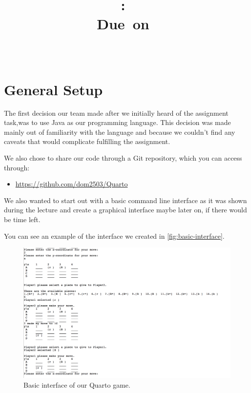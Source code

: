 \documentclass{scrartcl}
\title{
\vspace{2in}
\textmd{\textbf{\hmwkClass:\ \hmwkTitle}}\\
\normalsize\vspace{0.1in}\small{Due\ on\ \hmwkDueDate}\\
\vspace{0.1in}\large{\textit{\hmwkClassInstructor\ \hmwkClassTime}}
\vspace{3in}
}
\author{\textbf{\hmwkAuthorName}}
\date{} %
\begin{document}
\maketitle



\newpage
\tableofcontents
\newpage

\section{General Setup}

The first decision our team made after we initially heard of the assignment task,was to use Java as our programming language. This decision was made mainly out of familiarity with the language and because we couldn't find any caveats that would complicate fulfilling the assignment.

We also chose to share our code through a Git repository, which you can access through:

\begin{itemize}
\item \url{https://github.com/dom2503/Quarto}
\end{itemize}

We also wanted to start out with a basic command line interface as it was shown during the lecture and create a graphical interface maybe later on, if there would be time left.

You can see an example of the interface we created in \autoref{fig:basic-interface}.

 \begin{figure}[bth]
 \includegraphics[width=1.0\linewidth]{graphics/basic-interface.png}
\caption{Basic interface of our Quarto game.}\label{fig:basic-interface}
 \end{figure}
\end{document}
